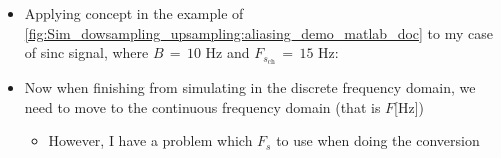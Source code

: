 \begin{itemize}
\begin{itemize}
\begin{itemize}
        \item However, \autoref{Eq:freq_conversion_rad_to_Hz} is normally used when Nyquist theorem is respected $\leftrightarrow \, F_s \, > \, 2 \, \times f_{\text{max}}$
        
        \item But in our case, it is not
        
        \item So this give me a question, what $F_s$ should I use to obtain correctly a distorted spectrum according to \autoref{fig:Sim_dowsampling_upsampling:aliasing_illustration}
        
    \end{itemize}
    
        \item Put frequency conversion formula
        
        \item All the overlapping and the spectrum is inside $[-\pi \, , \, \pi]$, even when aliasing occurs
        
        \item Show the plot of a aliased sinc now, and compare it to the left plot of \autoref{fig:Sim_dowsampling_upsampling:CTFT_Amp_Sinc_B_10_Fs_60_15} 
        
    \end{itemize}

\item Applying concept in the example of \autoref{fig:Sim_dowsampling_upsampling:aliasing_demo_matlab_doc} to my case of sinc signal, where $B \, = \, 10$ Hz and $F_{s_{\text{ch}}} \, = \, 15$ Hz: 
        
\item Now when finishing from simulating in the discrete frequency domain, we need to move to the continuous frequency domain (that is $F$[Hz])

\begin{itemize}
    \item However, I have a problem which $F_s$ to use
     when doing the conversion
    
    
\end{itemize}


    
\end{itemize}




